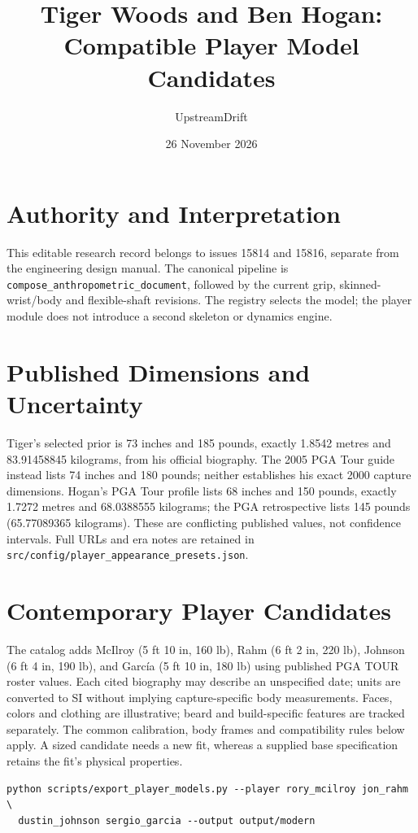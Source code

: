 \documentclass{article}
\title{Tiger Woods and Ben Hogan: Compatible Player Model Candidates}
\author{UpstreamDrift}
\date{26 November 2026}
\begin{document}
\maketitle
\section{Authority and Interpretation}
This editable research record belongs to issues 15814 and 15816, separate from
the engineering design manual. The canonical pipeline is
\texttt{compose\_anthropometric\_document}, followed by the current grip,
skinned-wrist/body and flexible-shaft revisions. The registry selects the model;
the player module does not introduce a second skeleton or dynamics engine.
\section{Published Dimensions and Uncertainty}
Tiger's selected prior is 73 inches and 185 pounds, exactly 1.8542 metres and
83.91458845 kilograms, from his official biography. The 2005 PGA Tour guide
instead lists 74 inches and 180 pounds; neither establishes his exact 2000
capture dimensions. Hogan's PGA Tour profile lists 68 inches and 150 pounds,
exactly 1.7272 metres and 68.0388555 kilograms; the PGA retrospective lists
145 pounds (65.77089365 kilograms). These are conflicting published values,
not confidence intervals. Full URLs and era notes are retained in
\texttt{src/config/player\_appearance\_presets.json}.
\section{Contemporary Player Candidates}
The catalog adds McIlroy (5 ft 10 in, 160 lb), Rahm (6 ft 2 in, 220 lb),
Johnson (6 ft 4 in, 190 lb), and Garc\'ia (5 ft 10 in, 180 lb) using published
PGA TOUR roster values. Each cited biography may describe an unspecified date;
units are converted to SI without implying capture-specific body measurements.
Faces, colors and clothing are illustrative; beard and build-specific features
are tracked separately. The common calibration, body frames and compatibility
rules below apply. A sized candidate needs a new fit, whereas a supplied base
specification retains the fit's physical properties.
\begin{verbatim}
python scripts/export_player_models.py --player rory_mcilroy jon_rahm \
  dustin_johnson sergio_garcia --output output/modern
\end{verbatim}
\end{document}

